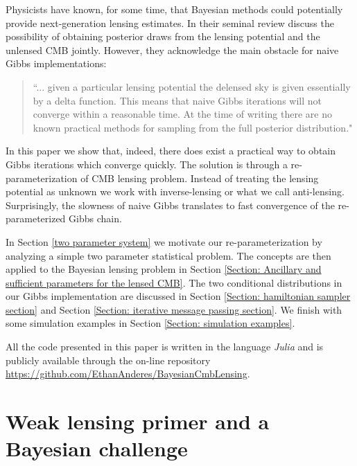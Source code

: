 \documentclass[iop,revtex4,apj,onecolumn]{emulateapj}
\begin{document}
Physicists have known, for some time, that Bayesian methods could potentially provide next-generation lensing estimates. In their seminal review \cite{Lewis20061} discuss the possibility of obtaining posterior draws from the lensing potential and the unlensed CMB jointly. However, they acknowledge the main obstacle for naive Gibbs implementations:
\begin{quote}
``... given a particular lensing potential the delensed sky is given essentially by a delta function.
This means that naive Gibbs iterations will not converge within a reasonable time. At the time of writing there are no known practical methods for sampling from the full posterior distribution."
\end{quote}
In this paper we show that, indeed, there does exist a practical way to obtain Gibbs iterations which converge quickly. The solution is through a re-parameterization of CMB lensing problem. Instead of treating the lensing potential as unknown we work with inverse-lensing or what we call anti-lensing. Surprisingly, the slowness of naive Gibbs translates to fast convergence of the re-parameterized Gibbs chain. 



In Section \ref{two parameter system} we motivate our re-parameterization by analyzing a simple two parameter statistical problem.  The concepts are then applied to the Bayesian lensing problem in Section \ref{Section: Ancillary and sufficient parameters for the lensed CMB}. The two conditional distributions in our Gibbs implementation are discussed in Section \ref{Section: hamiltonian sampler section} and Section \ref{Section: iterative message passing section}. We finish with some  simulation examples in Section \ref{Section: simulation examples}. 


All the code presented in this paper is written in the language {\em Julia} \citep{bezanson2012julia} and is publicly available through the on-line repository \url{https://github.com/EthanAnderes/BayesianCmbLensing}.  




%
%
\section{Weak lensing primer and a Bayesian challenge}
\label{primer}
\end{document}
